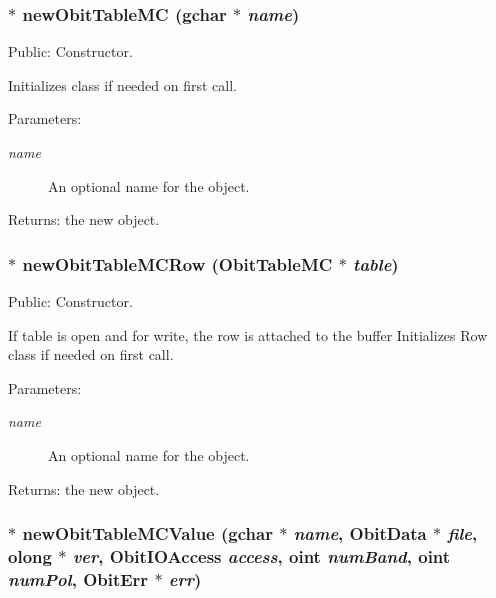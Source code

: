\subsubsection{$\ast$ new\-Obit\-Table\-MC (gchar $\ast$ {\em name})}\label{ObitTableMC_8c_a16}


Public: Constructor. 

Initializes class if needed on first call. \begin{Desc}
\item[Parameters:]
\begin{description}
\item[{\em name}]An optional name for the object. \end{description}
\end{Desc}
\begin{Desc}
\item[Returns:]the new object. \end{Desc}
\subsubsection{$\ast$ new\-Obit\-Table\-MCRow ({\bf Obit\-Table\-MC} $\ast$ {\em table})}\label{ObitTableMC_8c_a14}


Public: Constructor. 

If table is open and for write, the row is attached to the buffer Initializes Row class if needed on first call. \begin{Desc}
\item[Parameters:]
\begin{description}
\item[{\em name}]An optional name for the object. \end{description}
\end{Desc}
\begin{Desc}
\item[Returns:]the new object. \end{Desc}
\subsubsection{$\ast$ new\-Obit\-Table\-MCValue (gchar $\ast$ {\em name}, {\bf Obit\-Data} $\ast$ {\em file}, {\bf olong} $\ast$ {\em ver}, Obit\-IOAccess {\em access}, {\bf oint} {\em num\-Band}, {\bf oint} {\em num\-Pol}, {\bf Obit\-Err} $\ast$ {\em err})}\label{ObitTableMC_8c_a18}



